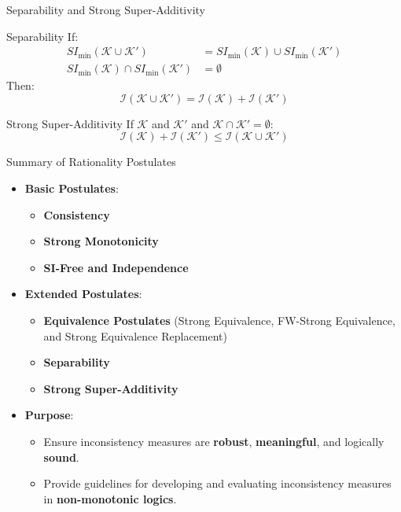 \begin{frame}{Separability and Strong Super-Additivity}
    \begin{block}{Separability}
        If:
        \begin{align*}
            SI_{\min}(\mathcal{K} \cup \mathcal{K}')            & = SI_{\min}(\mathcal{K}) \cup SI_{\min}(\mathcal{K}') \\
            SI_{\min}(\mathcal{K}) \cap SI_{\min}(\mathcal{K}') & = \emptyset
        \end{align*}
        Then:
        \[
            \mathcal{I}(\mathcal{K} \cup \mathcal{K}') = \mathcal{I}(\mathcal{K}) + \mathcal{I}(\mathcal{K}')
        \]
    \end{block}
    \begin{block}{Strong Super-Additivity}
        If \( \mathcal{K} \) and \( \mathcal{K}' \)  and \( \mathcal{K} \cap \mathcal{K}' = \emptyset \):
        \[
            \mathcal{I}(\mathcal{K}) + \mathcal{I}(\mathcal{K}') \leq \mathcal{I}(\mathcal{K} \cup \mathcal{K}')
        \]
    \end{block}
\end{frame}

\begin{frame}{Summary of Rationality Postulates}
    \begin{itemize}
        \item \textbf{Basic Postulates}:
              \begin{itemize}
                  \item \textbf{Consistency}
                  \item \textbf{Strong Monotonicity}
                  \item \textbf{SI-Free and Independence}
              \end{itemize}
        \item \textbf{Extended Postulates}:
              \begin{itemize}
                  \item \textbf{Equivalence Postulates} (Strong Equivalence, FW-Strong Equivalence, and Strong Equivalence Replacement)
                  \item \textbf{Separability}
                  \item \textbf{Strong Super-Additivity}
              \end{itemize}
        \item \textbf{Purpose}:
              \begin{itemize}
                  \item Ensure inconsistency measures are \textbf{robust}, \textbf{meaningful}, and logically \textbf{sound}.
                  \item Provide guidelines for developing and evaluating inconsistency measures in \textbf{non-monotonic logics}.
              \end{itemize}
    \end{itemize}
\end{frame}

